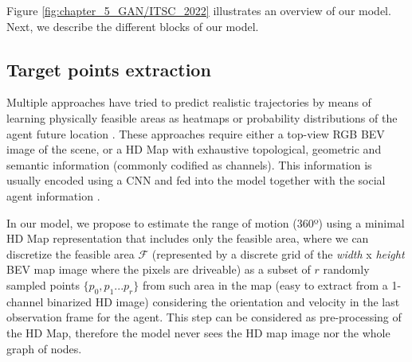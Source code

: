 Figure \ref{fig:chapter_5_GAN/ITSC_2022} illustrates an overview of our model. Next, we describe the different blocks of our model.

\subsection{Target points extraction}
\label{subsec:5_target_points_extraction}

Multiple approaches have tried to predict realistic trajectories by means of learning physically feasible areas as heatmaps or probability distributions of the agent future location \cite{dendorfer2020goal, sadeghian2019sophie, gilles2021home}. These approaches require either a top-view RGB BEV image of the scene, or a HD Map with exhaustive topological, geometric and semantic information (commonly codified as channels). This information is usually encoded using a CNN and fed into the model together with the social agent information \cite{dendorfer2020goal, sadeghian2019sophie, gao2020vectornet}.

In our model, we propose to estimate the range of motion (360º) using a minimal HD Map representation that includes only the feasible area, where we can discretize the feasible area $\mathcal{F}$ (represented by a discrete grid of the \textit{width} x \textit{height} BEV map image where the pixels are driveable) as a subset of $r$ randomly sampled points $\{p_0 , p_1 ... p_r\}$ from such area in the map (easy to extract from a 1-channel binarized HD image) considering the orientation and velocity in the last observation frame for the agent. This step can be considered as pre-processing of the HD Map, therefore the model never sees the HD map image nor the whole graph of nodes. 

